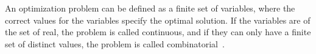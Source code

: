 \documentclass[conference]{IEEEtran}
\newcommand{\commentib}[1]{{\color{blue} [IB: #1]}}
\begin{document}
An optimization problem can be defined as a finite set of variables, where the correct values for the variables specify the optimal solution. If the variables are of the set of real, the problem is called continuous, and if they can only have a finite set of distinct values, the problem is called combinatorial~\cite{korte2012combinatorial}.

%
%	
%	
%	
%	
\end{document}
